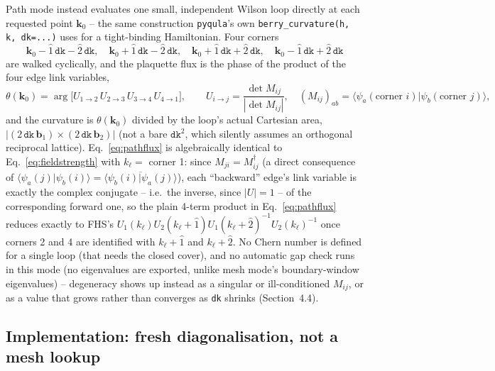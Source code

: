 \documentclass[11pt]{article}
\begin{document}
Path mode instead evaluates one small, independent Wilson loop directly at each
requested point $\mathbf k_0$ -- the same construction \texttt{pyqula}'s own
\texttt{berry\_curvature(h, k, dk=...)} uses for a tight-binding Hamiltonian. Four
corners
\begin{equation}
  \mathbf k_0 - \hat 1\,\texttt{dk} - \hat 2\,\texttt{dk}, \quad
  \mathbf k_0 + \hat 1\,\texttt{dk} - \hat 2\,\texttt{dk}, \quad
  \mathbf k_0 + \hat 1\,\texttt{dk} + \hat 2\,\texttt{dk}, \quad
  \mathbf k_0 - \hat 1\,\texttt{dk} + \hat 2\,\texttt{dk}
  \label{eq:corners}
\end{equation}
are walked cyclically, and the plaquette flux is the phase of the product of the four
edge link variables,
\begin{equation}
  \theta(\mathbf k_0) = \arg\bigl[U_{1\to2}\,U_{2\to3}\,U_{3\to4}\,U_{4\to1}\bigr],
  \qquad U_{i\to j} = \frac{\det M_{ij}}{|\det M_{ij}|}, \quad
  (M_{ij})_{ab} = \langle\psi_a(\text{corner } i)|\psi_b(\text{corner } j)\rangle,
  \label{eq:pathflux}
\end{equation}
and the curvature is $\theta(\mathbf k_0)$ divided by the loop's actual Cartesian area,
$|(2\,\texttt{dk}\,\mathbf b_1)\times(2\,\texttt{dk}\,\mathbf b_2)|$ (not a bare
$\texttt{dk}^2$, which silently assumes an orthogonal reciprocal lattice).
Eq.~\eqref{eq:pathflux} is algebraically identical to Eq.~\eqref{eq:fieldstrength} with
$k_\ell = $ corner 1: since $M_{ji} = M_{ij}^\dagger$ (a direct consequence of
$\langle\psi_a(j)|\psi_b(i)\rangle = \overline{\langle\psi_b(i)|\psi_a(j)\rangle}$), each
``backward'' edge's link variable is exactly the complex conjugate -- i.e.\ the
inverse, since $|U|=1$ -- of the corresponding forward one, so the plain 4-term product
in Eq.~\eqref{eq:pathflux} reduces exactly to FHS's
$U_1(k_\ell)U_2(k_\ell+\hat1)U_1(k_\ell+\hat2)^{-1}U_2(k_\ell)^{-1}$ once corners 2 and 4
are identified with $k_\ell+\hat1$ and $k_\ell+\hat2$. No Chern number is defined for a
single loop (that needs the closed cover), and no automatic gap check runs in this mode
(no eigenvalues are exported, unlike mesh mode's boundary-window eigenvalues) --
degeneracy shows up instead as a singular or ill-conditioned $M_{ij}$, or as a value that
grows rather than converges as \texttt{dk} shrinks (Section~4.4).

\subsection{Implementation: fresh diagonalisation, not a mesh lookup}
\end{document}
